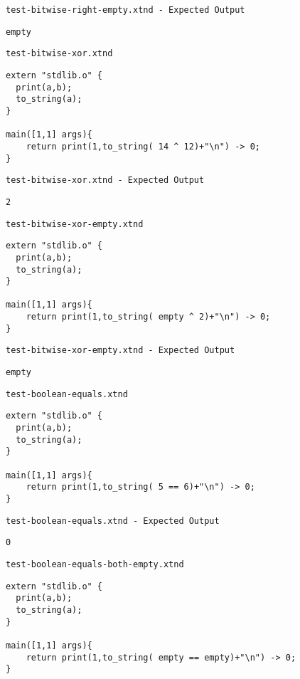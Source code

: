 \medskip \noindent \texttt{test-bitwise-right-empty.xtnd - Expected Output}


\begin{lstlisting}
empty
\end{lstlisting}


\medskip \noindent \texttt{test-bitwise-xor.xtnd}


\begin{lstlisting}
extern "stdlib.o" {
  print(a,b);
  to_string(a);
}

main([1,1] args){
	return print(1,to_string( 14 ^ 12)+"\n") -> 0;
}
\end{lstlisting}


\medskip \noindent \texttt{test-bitwise-xor.xtnd - Expected Output}


\begin{lstlisting}
2
\end{lstlisting}


\medskip \noindent \texttt{test-bitwise-xor-empty.xtnd}


\begin{lstlisting}
extern "stdlib.o" {
  print(a,b);
  to_string(a);
}

main([1,1] args){
	return print(1,to_string( empty ^ 2)+"\n") -> 0;
}
\end{lstlisting}


\medskip \noindent \texttt{test-bitwise-xor-empty.xtnd - Expected Output}


\begin{lstlisting}
empty
\end{lstlisting}


\medskip \noindent \texttt{test-boolean-equals.xtnd}


\begin{lstlisting}
extern "stdlib.o" {
  print(a,b);
  to_string(a);
}

main([1,1] args){
	return print(1,to_string( 5 == 6)+"\n") -> 0;
}
\end{lstlisting}


\medskip \noindent \texttt{test-boolean-equals.xtnd - Expected Output}


\begin{lstlisting}
0
\end{lstlisting}


\medskip \noindent \texttt{test-boolean-equals-both-empty.xtnd}


\begin{lstlisting}
extern "stdlib.o" {
  print(a,b);
  to_string(a);
}

main([1,1] args){
	return print(1,to_string( empty == empty)+"\n") -> 0;
}
\end{lstlisting}


